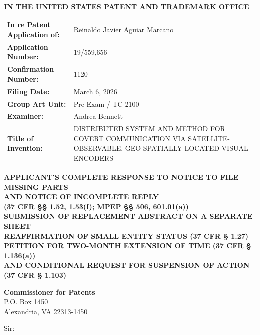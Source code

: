 \documentclass[11pt,letterpaper]{article}
\begin{document}
\thispagestyle{empty}

\begin{center}
    \large\textbf{IN THE UNITED STATES PATENT AND TRADEMARK OFFICE} \\
\end{center}

\vspace{0.3cm}
\noindent\begin{tabular}{p{2.3in}p{4.0in}}
\textbf{In re Patent Application of:} & Reinaldo Javier Aguiar Marcano \\
\textbf{Application Number:} & 19/559,656 \\
\textbf{Confirmation Number:} & 1120 \\
\textbf{Filing Date:} & March 6, 2026 \\
\textbf{Group Art Unit:} & Pre-Exam / TC 2100 \\
\textbf{Examiner:} & Andrea Bennett \\
\textbf{Title of Invention:} & DISTRIBUTED SYSTEM AND METHOD FOR COVERT COMMUNICATION VIA SATELLITE-OBSERVABLE, GEO-SPATIALLY LOCATED VISUAL ENCODERS \\
\end{tabular}

\vspace{0.8cm}
\begin{center}
    \textbf{\large APPLICANT'S COMPLETE RESPONSE TO NOTICE TO FILE MISSING PARTS \\
    AND NOTICE OF INCOMPLETE REPLY \\
    (37 CFR \S\S{} 1.52, 1.53(f); MPEP \S\S{} 506, 601.01(a)) \\
    SUBMISSION OF REPLACEMENT ABSTRACT ON A SEPARATE SHEET \\
    REAFFIRMATION OF SMALL ENTITY STATUS (37 CFR \S{} 1.27) \\
    PETITION FOR TWO-MONTH EXTENSION OF TIME (37 CFR \S{} 1.136(a)) \\
    AND CONDITIONAL REQUEST FOR SUSPENSION OF ACTION (37 CFR \S{} 1.103)}
\end{center}

\vspace{0.3cm}
\noindent\textbf{Commissioner for Patents} \\
\noindent P.O. Box 1450 \\
\noindent Alexandria, VA 22313-1450

\vspace{0.3cm}
\noindent Sir:
\end{document}
